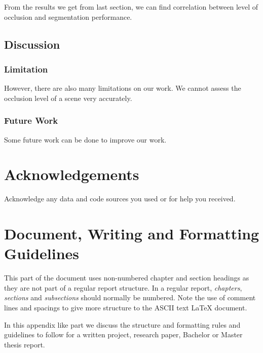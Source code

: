 \documentclass[11pt, a4paper,oneside,chapterprefix=false]{scrbook}
\begin{document}
From the results we get from last section, we can find correlation between level of occlusion and segmentation performance.

\section{Discussion}

\subsection{Limitation}

However, there are also many limitations on our work. We cannot assess the occlusion level of a scene very accurately.

\subsection{Future Work}

Some future work can be done to improve our work.

\chapter{Acknowledgements} \label{chp:acknowledgements}

Acknowledge any data and code sources you used or for help you received.


\chapter*{Document, Writing and Formatting Guidelines}

This part of the document uses non-numbered chapter and section headings as they are not part of a regular report structure. In a regular report, \textit{chapters}, \textit{sections} and \textit{subsections} should normally be numbered. Note the use of comment lines and spacings to give more structure to the ASCII text LaTeX document.

In this appendix like part we discuss the structure and formatting rules and guidelines to follow for a written project, research paper, Bachelor or Master thesis report.

\end{document}
